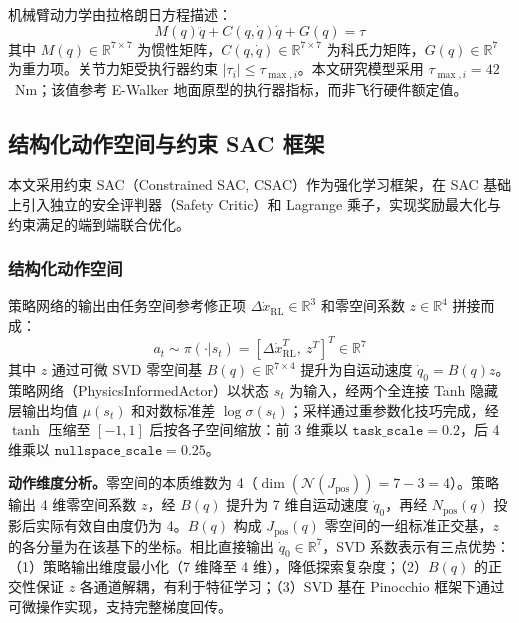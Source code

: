 \documentclass[10pt,conference]{IEEEtran}
\begin{document}
机械臂动力学由拉格朗日方程描述：
\begin{equation}
M(q)\ddot{q} + C(q,\dot{q})\dot{q} + G(q) = \tau
\label{eq:dynamics}
\end{equation}
其中 $M(q) \in \mathbb{R}^{7 \times 7}$ 为惯性矩阵，$C(q,\dot{q}) \in \mathbb{R}^{7 \times 7}$ 为科氏力矩阵，$G(q) \in \mathbb{R}^7$ 为重力项。关节力矩受执行器约束 $|\tau_i| \leq \tau_{\max,i}$。本文研究模型采用 $\tau_{\max,i}=42$~Nm；该值参考 E-Walker 地面原型的执行器指标，而非飞行硬件额定值。

\subsection{结构化动作空间与约束 SAC 框架}
\label{sec:policy_network}

本文采用约束 SAC（Constrained SAC, CSAC）作为强化学习框架，在 SAC 基础上引入独立的安全评判器（Safety Critic）和 Lagrange 乘子，实现奖励最大化与约束满足的端到端联合优化。

\subsubsection{结构化动作空间}
策略网络的输出由任务空间参考修正项 $\Delta \dot{x}_{\text{RL}} \in \mathbb{R}^3$ 和零空间系数 $z \in \mathbb{R}^4$ 拼接而成：
\begin{equation}
a_t \sim \pi(\cdot|s_t) = \left[ \Delta \dot{x}_{\text{RL}}^T,\ z^T \right]^T \in \mathbb{R}^{7}
\label{eq:action}
\end{equation}
其中 $z$ 通过可微 SVD 零空间基 $B(q) \in \mathbb{R}^{7 \times 4}$ 提升为自运动速度 $\dot{q}_0 = B(q)z$。策略网络（PhysicsInformedActor）以状态 $s_t$ 为输入，经两个全连接 Tanh 隐藏层输出均值 $\mu(s_t)$ 和对数标准差 $\log\sigma(s_t)$；采样通过重参数化技巧完成，经 $\tanh$ 压缩至 $[-1,1]$ 后按各子空间缩放：前 3 维乘以 $\texttt{task\_scale}=0.2$，后 4 维乘以 $\texttt{nullspace\_scale}=0.25$。

\textbf{动作维度分析。}零空间的本质维数为 4（$\dim(\mathcal{N}(J_{\text{pos}})) = 7 - 3 = 4$）。策略输出 4 维零空间系数 $z$，经 $B(q)$ 提升为 7 维自运动速度 $\dot{q}_0$，再经 $N_{\text{pos}}(q)$ 投影后实际有效自由度仍为 4。$B(q)$ 构成 $J_{\text{pos}}(q)$ 零空间的一组标准正交基，$z$ 的各分量为在该基下的坐标。相比直接输出 $\dot{q}_0 \in \mathbb{R}^7$，SVD 系数表示有三点优势：（1）策略输出维度最小化（7 维降至 4 维），降低探索复杂度；（2）$B(q)$ 的正交性保证 $z$ 各通道解耦，有利于特征学习；（3）SVD 基在 Pinocchio 框架下通过可微操作实现，支持完整梯度回传。
\end{document}
